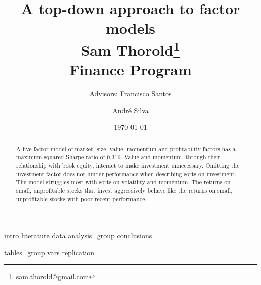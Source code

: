 \documentclass[a4paper, 12pt]{article}
\title{
  {A top-down approach to factor models}\\[1cm]
  {\Large Sam Thorold\thanks{sam.thorold@gmail.com}}\\
  {\large Finance Program}\\
}
\author[1]{Advisors: Francisco Santos}
\affil[1]{Norwegian School of Economics}
\author[2]{Andr\'e Silva}
\affil[2]{NOVA School of Business and Economics}
\date{\today}
\begin{document}
\maketitle


\begin{abstract}
  A five-factor model of
  market, size, value, momentum and profitability factors
  has a maximum squared Sharpe ratio of 0.316.
  Value and momentum, through their relationship with book equity,
  interact to make investment unnecessary.
  Omitting the investment factor does not hinder performance when describing
  sorts on investment.
  The model struggles most with sorts on volatility and momentum.
  The returns on small, unprofitable stocks that invest aggressively behave
  like the returns on small, unprofitable stocks with poor recent performance.
\end{abstract}


{intro}
{literature}
{data}
{analysis_group}
{conclusions}


\printbibliography

\appendix
{tables_group}
{vars}
{replication}
\end{document}
